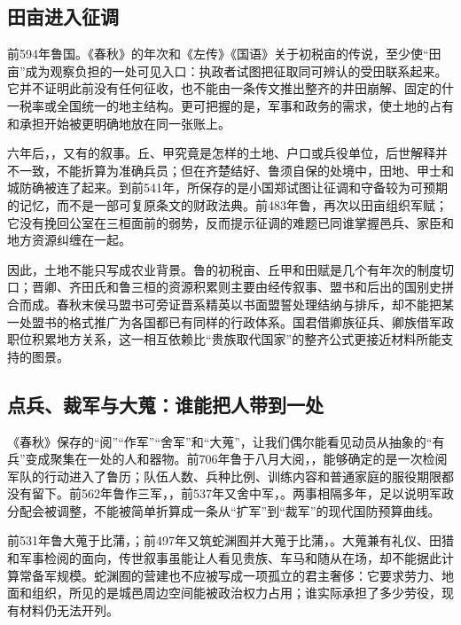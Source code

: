 \subsection{田亩进入征调}

前594年鲁国。《春秋》的年次和《左传》《国语》关于初税亩的传说，至少使“田亩”成为观察负担的一处可见入口：执政者试图把征取同可辨认的受田联系起来。它并不证明此前没有任何征收，也不能由一条传文推出整齐的井田崩解、固定的什一税率或全国统一的地主结构。更可把握的是，军事和政务的需求，使土地的占有和承担开始被更明确地放在同一张账上。

六年后，，又有的叙事。丘、甲究竟是怎样的土地、户口或兵役单位，后世解释并不一致，不能折算为准确兵员；但在齐楚结好、鲁须自保的处境中，田地、甲士和城防确被连了起来。到前541年，所保存的是小国郑试图让征调和守备较为可预期的记忆，而不是一部可复原条文的财政法典。前483年鲁，再次以田亩组织军赋；它没有挽回公室在三桓面前的弱势，反而提示征调的难题已同谁掌握邑兵、家臣和地方资源纠缠在一起。

因此，土地不能只写成农业背景。鲁的初税亩、丘甲和田赋是几个有年次的制度切口；晋卿、齐田氏和鲁三桓的资源积累则主要由经传叙事、盟书和后出的国别史拼合而成。春秋末侯马盟书可旁证晋系精英以书面盟誓处理结纳与排斥，却不能把某一处盟书的格式推广为各国都已有同样的行政体系。国君借卿族征兵、卿族借军政职位积累地方关系，这一相互依赖比“贵族取代国家”的整齐公式更接近材料所能支持的图景。

\subsection{点兵、裁军与大蒐：谁能把人带到一处}

《春秋》保存的“阅”“作军”“舍军”和“大蒐”，让我们偶尔能看见动员从抽象的“有兵”变成聚集在一处的人和器物。前706年鲁于八月大阅，，能够确定的是一次检阅军队的行动进入了鲁历；队伍人数、兵种比例、训练内容和普通家庭的服役期限都没有留下。前562年鲁作三军，，前537年又舍中军，。两事相隔多年，足以说明军政分配会被调整，不能被简单折算成一条从“扩军”到“裁军”的现代国防预算曲线。

前531年鲁大蒐于比蒲，；前497年又筑蛇渊囿并大蒐于比蒲，。大蒐兼有礼仪、田猎和军事检阅的面向，传世叙事虽能让人看见贵族、车马和随从在场，却不能据此计算常备军规模。蛇渊囿的营建也不应被写成一项孤立的君主奢侈：它要求劳力、地面和组织，所见的是城邑周边空间能被政治权力占用；谁实际承担了多少劳役，现有材料仍无法开列。

